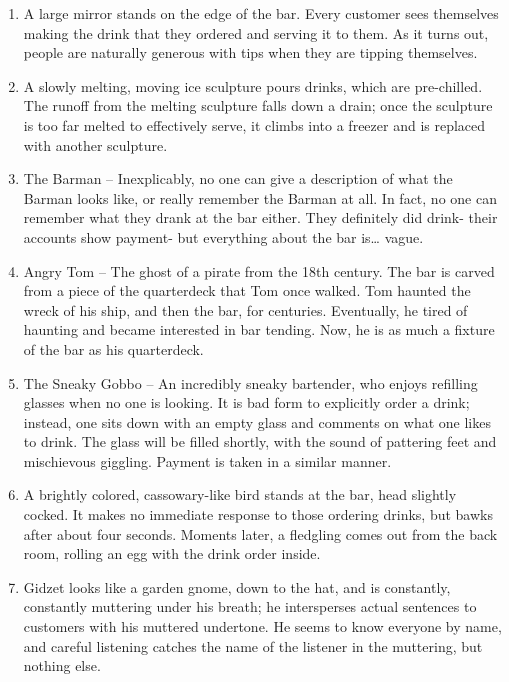 \documentclass{article}
\begin{document}
\begin{enumerate}
	\item A large mirror stands on the edge of the bar. Every customer sees themselves making the drink that they ordered and serving it to them. As it turns out, people are naturally generous with tips when they are tipping themselves.
	\item A slowly melting, moving ice sculpture pours drinks, which are pre-chilled. The runoff from the melting sculpture falls down a drain; once the sculpture is too far melted to effectively serve, it climbs into a freezer and is replaced with another sculpture.
	\item The Barman – Inexplicably, no one can give a description of what the Barman looks like, or really remember the Barman at all. In fact, no one can remember what they drank at the bar either. They definitely did drink- their accounts show payment- but everything about the bar is… vague.
	\item Angry Tom – The ghost of a pirate from the 18th century. The bar is carved from a piece of the quarterdeck that Tom once walked. Tom haunted the wreck of his ship, and then the bar, for centuries. Eventually, he tired of haunting and became interested in bar tending. Now, he is as much a fixture of the bar as his quarterdeck.
	\item The Sneaky Gobbo – An incredibly sneaky bartender, who enjoys refilling glasses when no one is looking. It is bad form to explicitly order a drink; instead, one sits down with an empty glass and comments on what one likes to drink. The glass will be filled shortly, with the sound of pattering feet and mischievous giggling. Payment is taken in a similar manner.
	\item A brightly colored, cassowary-like bird stands at the bar, head slightly cocked. It makes no immediate response to those ordering drinks, but bawks after about four seconds. Moments later, a fledgling comes out from the back room, rolling an egg with the drink order inside.
	\item Gidzet looks like a garden gnome, down to the hat, and is constantly, constantly muttering under his breath; he intersperses actual sentences to customers with his muttered undertone. He seems to know everyone by name, and careful listening catches the name of the listener in the muttering, but nothing else.

\end{enumerate}
\end{document}
